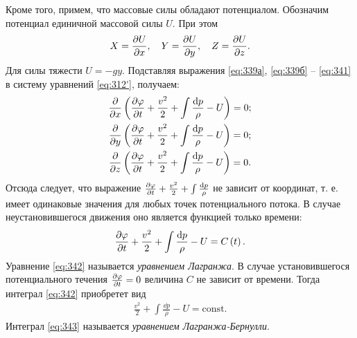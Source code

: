 	Кроме того, примем, что массовые силы обладают потенциалом. Обозначим потенциал единичной массовой силы $U$. При этом
	\begin{gather}\label{eq:341}
		X = \frac{\partial U}{\partial x},\quad
		Y = \frac{\partial U}{\partial y},\quad
		Z = \frac{\partial U}{\partial z}.
	\end{gather}\n
	Для силы тяжести $U = -gy$.\n
	Подставляя выражения \eqref{eq:339а}, \eqref{eq:339б} -- \eqref{eq:341} в систему уравнений \eqref{eq:312'}, получаем:
	\begin{gather*}
		\frac{\pp}{\pp x}\left(\frac{\pp\varphi}{\pp t} + \frac{v^2}{2} + \int\frac{\dd p}{\rho} - U\right) = 0;\\
		\frac{\pp}{\pp y}\left(\frac{\pp\varphi}{\pp t} + \frac{v^2}{2} + \int\frac{\dd p}{\rho} - U\right) = 0;\\
		\frac{\pp}{\pp z}\left(\frac{\pp\varphi}{\pp t} + \frac{v^2}{2} + \int\frac{\dd p}{\rho} - U\right) = 0.
	\end{gather*}\n
	Отсюда следует, что выражение $\frac{\pp\varphi}{\pp t} + \frac{v^2}{2} + \int\frac{\dd p}{\rho}$ не зависит от координат, т. е. имеет одинаковые значения для любых точек потенциального потока. В случае неустановившегося движения оно является функцией только времени:
	\begin{gather}\label{eq:342}
		\frac{\pp\varphi}{\pp t} + \frac{v^2}{2} + \int\frac{\dd p}{\rho} - U = C\left(t\right).
	\end{gather}\n
	Уравнение \eqref{eq:342} называется \textit{уравнением Лагранжа}.\n
	В случае установившегося потенциального течения $\frac{\partial\varphi}{\partial t} = 0$ величина $C$ не зависит от времени. Тогда интеграл \eqref{eq:342} приобретет вид
	\begin{gather}\label{eq:343}
		\frac{v^2}{2} + \int\frac{\dd p}{\rho} - U = \mathrm{const}.
	\end{gather}\n
	Интеграл \eqref{eq:343} называется \textit{уравнением Лагранжа-Бернулли}.
	
